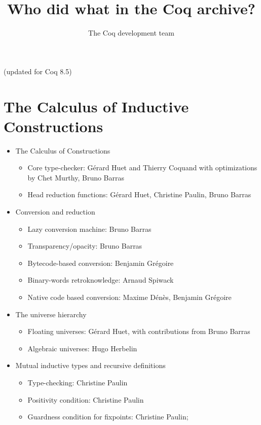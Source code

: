 \documentclass{article}
\begin{document}
\title{Who did what in the Coq archive?}

\author{The Coq development team}

\maketitle

\centerline{(updated for Coq 8.5)}

\section{The Calculus of Inductive Constructions}

\begin{itemize}
\item The Calculus of Constructions
  \begin{itemize}
  \item Core type-checker: Gérard Huet and Thierry Coquand with
    optimizations by Chet Murthy, Bruno Barras
  \item Head reduction functions: Gérard Huet, Christine Paulin, Bruno Barras
  \end{itemize}
\item Conversion and reduction
  \begin{itemize}
  \item Lazy conversion machine: Bruno Barras
  \item Transparency/opacity: Bruno Barras
  \item Bytecode-based conversion: Benjamin Grégoire
  \item Binary-words retroknowledge: Arnaud Spiwack 
  \item Native code based conversion: Maxime Dénès, Benjamin Grégoire
  \end{itemize}
\item The universe hierarchy
  \begin{itemize}
  \item Floating universes: Gérard Huet, with contributions from Bruno Barras
  \item Algebraic universes: Hugo Herbelin
  \end{itemize}
\item Mutual inductive types and recursive definitions
  \begin{itemize}
  \item Type-checking: Christine Paulin
  \item Positivity condition: Christine Paulin
  \item Guardness condition for fixpoints: Christine Paulin;

\end{itemize}
\end{itemize}
\end{document}
